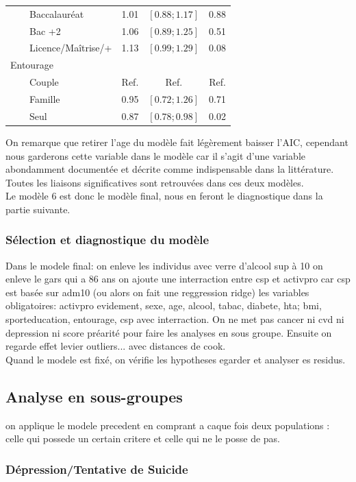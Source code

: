 \documentclass{book}
\begin{document}
\begin{longtable}{lccc}
$\qquad$Baccalauréat&1.01&$\left[0.88 ; 1.17 \right]$&0.88\\
$\qquad$Bac +2&1.06&$\left[0.89 ; 1.25 \right]$&0.51\\
$\qquad$Licence/Maîtrise/+ & 1.13 & $\left[0.99 ; 1.29 \right]$ &0.08\\
Entourage &&&\\
$\qquad$Couple&Ref.&Ref.&Ref.\\
$\qquad$Famille &0.95&$\left[0.72 ; 1.26 \right]$&0.71\\
$\qquad$Seul&0.87& $\left[0.78 ; 0.98 \right]$& 0.02\\
    \hline
    \end{longtable} 

\noindent
On remarque que retirer l'age du modèle fait légèrement baisser l'AIC, cependant nous garderons cette variable dans le modèle car il s'agit d'une variable abondamment documentée et décrite comme indispensable dans la littérature.\\
Toutes les liaisons significatives sont retrouvées dans ces deux modèles.\\
Le modèle 6 est donc le modèle final, nous en feront le diagnostique dans la partie suivante.\\


\subsubsection{Sélection et diagnostique du modèle}
Dans le modele final: on enleve les individus avec verre d'alcool sup à 10 on enleve le gars qui a 86 ans on ajoute une interraction entre csp et activpro car csp est basée sur adm10 (ou alors on fait une reggression ridge)
les variables obligatoires: activpro evidement, sexe, age, alcool, tabac, diabete, hta; bmi, sporteducation, entourage, csp avec interraction. On ne met pas cancer ni cvd ni depression ni score préarité pour faire les analyses en sous groupe.
Ensuite on regarde effet levier outliers... avec distances de cook.\\

Quand le modele est fixé, on vérifie les hypotheses egarder et analyser es residus.
\subsection{Analyse en sous-groupes}
on applique le modele precedent en comprant a caque fois deux populations : celle qui possede un certain critere et celle qui ne le posse de pas.
\subsubsection{Dépression/Tentative de Suicide}
\end{document}

